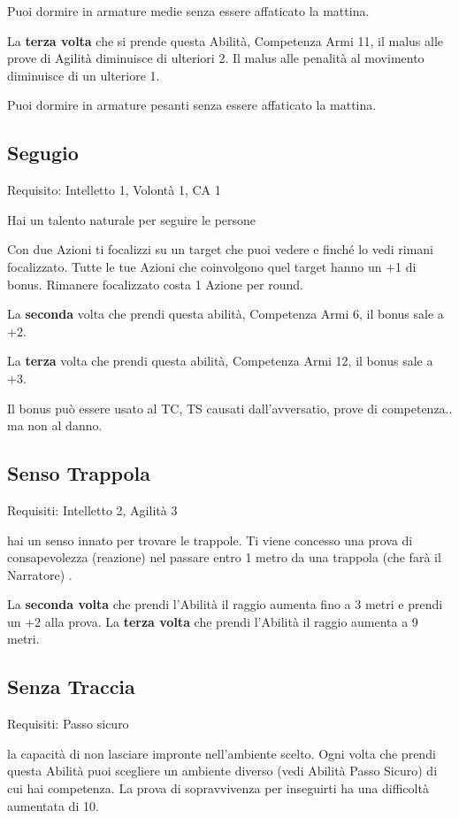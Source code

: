 \documentclass[a4paper,11pt,twoside,openany]{book}
\begin{document}
Puoi dormire in armature medie senza essere affaticato la mattina.

La \textbf{terza volta} che si prende questa Abilità, Competenza Armi 11, il malus alle prove di Agilità diminuisce di ulteriori 2. Il malus alle penalità al movimento diminuisce di un ulteriore 1.

Puoi dormire in armature pesanti senza essere affaticato la mattina.

\subsection{Segugio}

Requisito: Intelletto 1, Volontà 1, CA 1

Hai un talento naturale per seguire le persone

Con due Azioni ti focalizzi su un target che puoi vedere e finché lo vedi rimani focalizzato. Tutte le tue Azioni che coinvolgono quel target hanno un +1 di bonus. Rimanere focalizzato costa 1 Azione per round.

La \textbf{seconda} volta che prendi questa abilità, Competenza Armi 6, il bonus sale a +2.

La \textbf{terza} volta che prendi questa abilità, Competenza Armi 12, il bonus sale a +3.

Il bonus può essere usato al TC, TS causati dall'avversatio, prove di competenza.. ma non al danno.

\subsection{Senso Trappola}

Requisiti: Intelletto 2, Agilità 3

hai un senso innato per trovare le trappole. Ti viene concesso una prova di consapevolezza (reazione) nel passare entro 1 metro da una trappola (che farà il Narratore) .

La \textbf{seconda volta} che prendi l'Abilità il raggio aumenta fino a 3 metri e prendi un +2 alla prova. La \textbf{terza volta} che prendi l'Abilità il raggio aumenta a 9 metri.

\subsection{Senza Traccia}

Requisiti: Passo sicuro

la capacità di non lasciare impronte nell'ambiente scelto. Ogni volta che prendi questa Abilità puoi scegliere un ambiente diverso (vedi Abilità Passo Sicuro) di cui hai competenza. La prova di sopravvivenza per inseguirti ha una difficoltà aumentata di 10.
\end{document}
